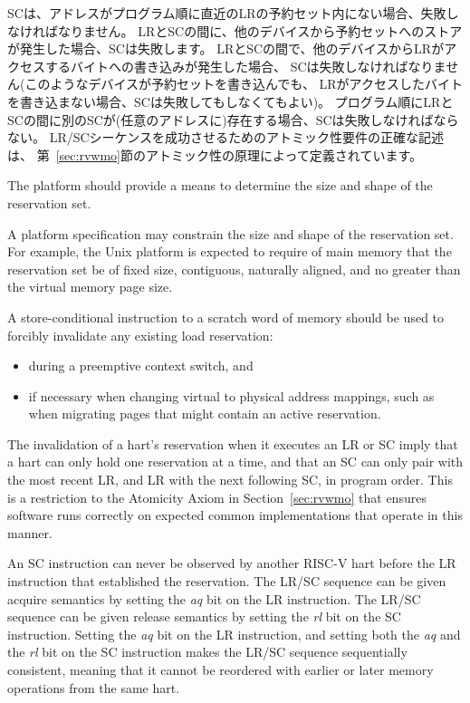 SCは、アドレスがプログラム順に直近のLRの予約セット内にない場合、失敗しなければなりません。
LRとSCの間に、他のデバイスから予約セットへのストアが発生した場合、SCは失敗します。
LRとSCの間で、他のデバイスからLRがアクセスするバイトへの書き込みが発生した場合、
SCは失敗しなければなりません(このようなデバイスが予約セットを書き込んでも、
LRがアクセスしたバイトを書き込まない場合、SCは失敗してもしなくてもよい)。
プログラム順にLRとSCの間に別のSCが(任意のアドレスに)存在する場合、SCは失敗しなければならない。
LR/SCシーケンスを成功させるためのアトミック性要件の正確な記述は、
第~\ref{sec:rvwmo}節のアトミック性の原理によって定義されています。

\begin{commentary}
The platform should provide a means to determine the size and shape of the
reservation set.

A platform specification may constrain the size and shape of the reservation
set.
For example, the Unix platform is expected to require of main memory that the
reservation set be of fixed size, contiguous, naturally aligned, and no
greater than the virtual memory page size.
\end{commentary}

\begin{commentary}
A store-conditional instruction to a scratch word of memory should be used
to forcibly invalidate any existing load reservation:
\begin{itemize}
\item during a preemptive context switch, and
\item if necessary when changing virtual to physical address mappings,
  such as when migrating pages that might contain an active reservation.
\end{itemize}
\end{commentary}

\begin{commentary}
The invalidation of a hart's reservation when it executes an LR or SC
imply that a hart can only hold one reservation at a time, and that
an SC can only pair with the most recent LR, and LR with the next
following SC, in program order.  This is a restriction to the
Atomicity Axiom in Section~\ref{sec:rvwmo} that ensures software runs
correctly on expected common implementations that operate in this manner.
\end{commentary}

An SC instruction can never be observed by another RISC-V hart
before the LR instruction that established the reservation.
The LR/SC
sequence can be given acquire semantics by setting the {\em aq} bit on
the LR instruction.  The LR/SC sequence can be given release semantics
by setting the {\em rl} bit on the SC instruction.  Setting the {\em
  aq} bit on the LR instruction, and setting both the {\em aq} and the {\em
  rl} bit on the SC instruction makes the LR/SC sequence sequentially
consistent, meaning that it cannot be reordered with earlier or
later memory operations from the same hart.

